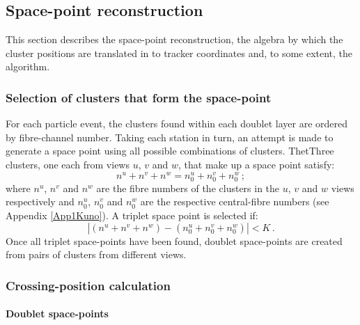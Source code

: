 \subsection{Space-point reconstruction}
\label{Sect:SpcPnt}

This section describes the space-point reconstruction, the algebra by
which the cluster positions are translated in to tracker coordinates
and, to some extent, the algorithm.

\subsubsection{Selection of clusters that form the space-point}

For each particle event, the clusters found within each doublet layer
are ordered by fibre-channel number.
Taking each station in turn, an attempt is made to generate a space
point using all possible combinations of clusters.
ThetThree clusters, one each from views $u$, $v$ and $w$, that make up
a space point satisfy:
\begin{equation}
 n^u + n^v + n^w = n^u_0 + n^v_0 + n^w_0 \, ;
\end{equation}
where $n^u$, $n^v$ and $n^w$ are the fibre numbers of the clusters in
the $u$, $v$ and $w$ views respectively and $n^u_0$, $n^v_0$ and
$n^w_0$ are the respective central-fibre numbers (see Appendix
\ref{App1Kuno}).
A triplet space point is selected if:
\begin{equation}
  | (n^u + n^v + n^w) - (n^u_0 + n^v_0 + n^w_0) | < K \, .
\end{equation}
Once all triplet space-points have been found, doublet space-points
are created from pairs of clusters from different views.

\subsubsection{Crossing-position calculation}

\paragraph{Doublet space-points}
\label{Para:DblSpPnt}

